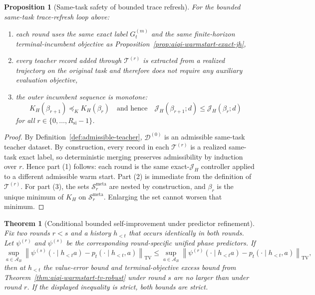 \documentclass[11pt]{article}
\newtheorem{theorem}{Theorem}
\newtheorem{proposition}{Proposition}
\begin{document}
\begin{proposition}[Same-task safety of bounded trace refresh]
\label{prop:aiqi-warmstart-self-improve-safe}
For the bounded same-task trace-refresh loop above:
\begin{enumerate}
    \item each round uses the same exact label $G_t^{(m)}$ and the same
    finite-horizon terminal-incumbent objective as
    Proposition~\ref{prop:aiqi-warmstart-exact-jh},
    \item every teacher record added through $\mathcal{T}^{(r)}$ is extracted
    from a realized trajectory on the original task and therefore does not
    require any auxiliary evaluation objective,
    \item the outer incumbent sequence is monotone:
    \[
    K_H(\beta_{r+1})\preceq_K K_H(\beta_r)
    \quad\text{and hence}\quad
    \mathcal{J}_H(\beta_{r+1};d)\le \mathcal{J}_H(\beta_r;d)
    \]
    for all $r\in\{0,\dots,R_{\mathrm{si}}-1\}$.
\end{enumerate}
\end{proposition}

\begin{proof}
By Definition~\ref{def:admissible-teacher}, $\mathcal{D}^{(0)}$ is an
admissible same-task teacher dataset. By construction, every record in each
$\mathcal{T}^{(r)}$ is a realized same-task exact label, so deterministic
merging preserves admissibility by induction over $r$. Hence part (1) follows:
each round is the same exact-$\mathcal{J}_H$ controller applied to a different
admissible warm start. Part (2) is immediate from the definition of
$\mathcal{T}^{(r)}$. For part (3), the sets
$\mathcal{S}_r^{\mathrm{meta}}$ are nested by construction, and $\beta_r$ is the
unique minimum of $K_H$ on $\mathcal{S}_r^{\mathrm{meta}}$. Enlarging the set
cannot worsen that minimum.
\end{proof}

\begin{theorem}[Conditional bounded self-improvement under predictor refinement]
\label{thm:aiqi-warmstart-self-improve}
Fix two rounds $r<s$ and a history $h_{<t}$ that occurs identically in both
rounds. Let $\psi^{(r)}$ and $\psi^{(s)}$ be the corresponding round-specific
unified phase predictors. If
\[
\sup_{a\in\mathcal{A}_B}
\left\|
\psi^{(s)}(\cdot\mid h_{<t}a)-p_t(\cdot\mid h_{<t},a)
\right\|_{\mathrm{TV}}
\le
\sup_{a\in\mathcal{A}_B}
\left\|
\psi^{(r)}(\cdot\mid h_{<t}a)-p_t(\cdot\mid h_{<t},a)
\right\|_{\mathrm{TV}},
\]
then at $h_{<t}$ the value-error bound and terminal-objective excess bound from
Theorem~\ref{thm:aiqi-warmstart-tv-robust} under round $s$ are no larger than
under round $r$. If the displayed inequality is strict, both bounds are strict.
\end{theorem}
\end{document}
